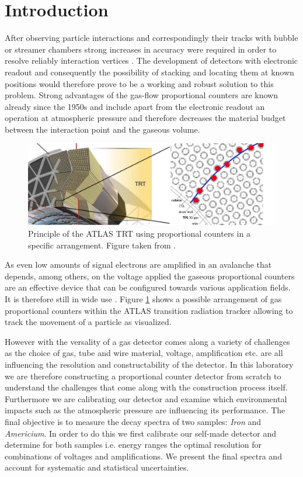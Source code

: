 \section{Introduction}  \label{sec:Introduction}
After observing particle interactions and correspondingly their tracks with
bubble or streamer chambers strong increases in accuracy were required in order
to resolve reliably interaction vertices \cite{charpak_high-resolution_1984}.
The development of detectors with electronic readout and consequently the
possibility of stacking and locating them at known positions would therefore
prove to be a working and robust solution to this problem. Strong advantages of
the gas-flow proportional counters are known already since the 1950s \cite{hendee_gasflow_1956} and include
apart from the electronic readout an operation at atmospheric pressure and
therefore decreases the material budget between the interaction point and the
gaseous volume.

\begin{figure}[H]
  \includegraphics[width=\linewidth]{graphics/ATLAS_TRT_Principle_image}
  \caption{Principle of the ATLAS TRT using proportional counters in a specific
    arrangement. Figure taken from \cite{colliderscope}.}
  \label{fig:colliderscope}
\end{figure}

As even low amounts of signal electrons are amplified in an
avalanche that depends, among others, on the voltage applied the gaseous
proportional counters are an effective device that can be configured towards
various application fields. It is therefore still in wide use
\cite{Mindur:2017nqn}. Figure \ref{fig:colliderscope} shows a possible
arrangement of gas proportional counters within the ATLAS transition radiation
tracker allowing to track the movement of a particle as visualized.

However with the versality of a gas detector comes along a variety of challenges
as the choice of gas, tube and wire material, voltage, amplification etc. are
all influencing the resolution and constructability of the detector. In this
laboratory we are therefore constructing a proportional counter detector from
scratch to understand the challenges that come along with the construction
process itself. Furthermore we are calibrating our detector and examine which
environmental impacts such as the atmospheric pressure are influencing its
performance. The final objective is to measure the decay spectra of two samples:
\emph{Iron} and \emph{Americium}. In order to do this we first calibrate our self-made
detector and determine for both samples i.e. energy ranges the optimal
resolution for combinations of voltages and amplifications. We present the final
spectra and account for systematic and statistical uncertainties.